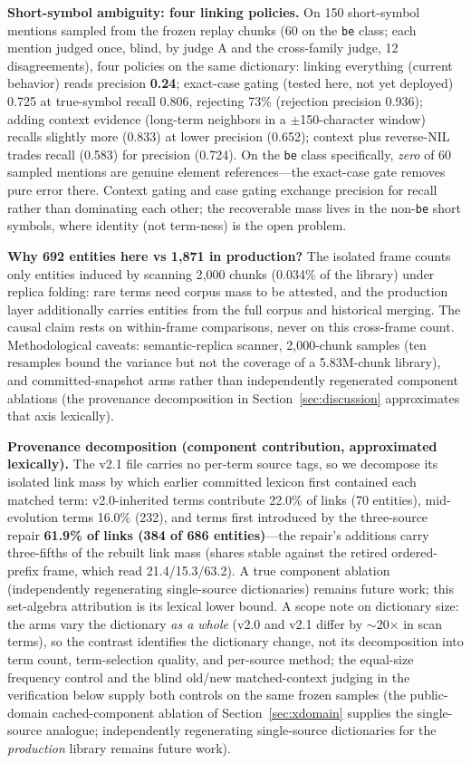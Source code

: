 \documentclass[preprint,12pt]{elsarticle}
\begin{document}
\textbf{Short-symbol ambiguity: four linking policies.} On 150
short-symbol mentions sampled from the frozen replay chunks (60 on the
\texttt{be} class; each mention judged once, blind, by judge A and
the cross-family judge, 12 disagreements), four policies on the same
dictionary: linking everything (current behavior) reads precision
\textbf{0.24}; exact-case gating (tested here, not yet deployed) 0.725 at
true-symbol recall 0.806, rejecting 73\% (rejection precision 0.936);
adding context evidence (long-term neighbors in a $\pm$150-character
window) recalls slightly more (0.833) at lower precision (0.652);
context plus reverse-NIL trades recall (0.583) for precision (0.724).
On the \texttt{be} class specifically, \emph{zero} of 60 sampled
mentions are genuine element references---the exact-case gate removes
pure error there. Context gating and case gating exchange precision
for recall rather than dominating each other; the recoverable mass
lives in the non-\texttt{be} short symbols, where identity (not
term-ness) is the open problem.

\textbf{Why 692 entities here vs 1{,}871 in production?} The isolated
frame counts only entities induced by scanning 2{,}000 chunks (0.034\%
of the library) under replica folding: rare terms need corpus mass to
be attested, and the production layer additionally carries entities
from the full corpus and historical merging. The causal claim rests on
within-frame comparisons, never on this cross-frame count.
Methodological caveats: semantic-replica scanner, 2{,}000-chunk samples
(ten resamples bound the variance but not the coverage of a 5.83M-chunk
library), and committed-snapshot arms rather than independently
regenerated component ablations (the provenance decomposition in
Section~\ref{sec:discussion} approximates that axis lexically).

\textbf{Provenance decomposition (component contribution, approximated
lexically).} The v2.1 file carries no per-term source tags, so we
decompose its isolated link mass by which earlier committed lexicon
first contained each matched term: v2.0-inherited terms contribute
22.0\% of links (70 entities), mid-evolution terms 16.0\% (232), and
terms first introduced by the three-source repair \textbf{61.9\% of
links (384 of 686 entities)}---the repair's additions carry
three-fifths of the rebuilt link mass (shares stable against the
retired ordered-prefix frame, which read 21.4/15.3/63.2). A true component ablation (independently
regenerating single-source dictionaries) remains future work; this
set-algebra attribution is its lexical lower bound. A scope note on
dictionary size: the arms vary the dictionary \emph{as a whole} (v2.0
and v2.1 differ by ${\sim}$20$\times$ in scan terms), so the contrast
identifies the dictionary change, not its decomposition into term
count, term-selection quality, and per-source method; the equal-size
frequency control and the blind old/new matched-context judging in the
verification below supply both controls on the same frozen samples
(the public-domain cached-component ablation of
Section~\ref{sec:xdomain} supplies the single-source analogue;
independently regenerating single-source dictionaries for the
\emph{production} library remains future work).
\end{document}
